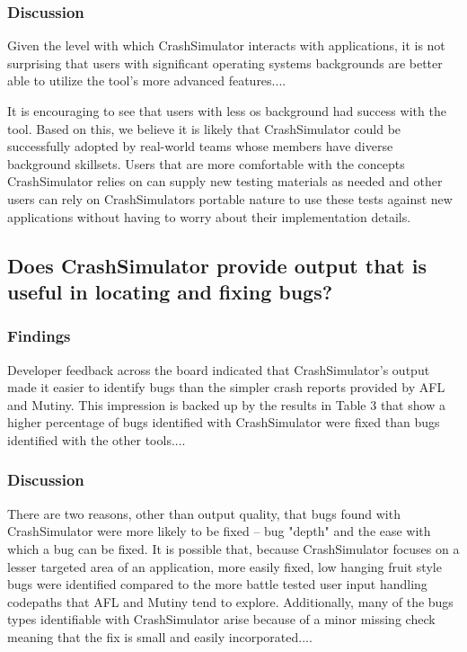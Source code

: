 \subsubsection{Discussion}

Given the level with which CrashSimulator interacts with applications, it
is not surprising that users with significant operating systems backgrounds
are better able to utilize the tool's more advanced features....

It is encouraging to see that users with less os background had success
with the tool.  Based on this, we believe it is likely that CrashSimulator
could be successfully adopted by real-world teams whose members have
diverse background skillsets.  Users that are more comfortable with the
concepts CrashSimulator relies on can supply new testing materials as
needed and other users can rely on CrashSimulators portable nature to use
these tests against new applications without having to worry about their
implementation details.


\subsection{Does CrashSimulator provide output that is useful in locating
and fixing bugs?}


\subsubsection{Findings}

Developer feedback across the board indicated that CrashSimulator's output
made it easier to identify bugs than the simpler crash reports provided by
AFL and Mutiny.  This impression is backed up by the results in Table 3
that show a higher percentage of bugs identified with CrashSimulator were
fixed than bugs identified with the other tools....


\subsubsection{Discussion}

There are two reasons, other than output quality, that bugs found with
CrashSimulator were more likely to be fixed -- bug "depth" and the ease
with which a bug can be fixed.  It is possible that, because CrashSimulator
focuses on a lesser targeted area of an application, more easily fixed, low
hanging fruit style bugs were identified compared to the more battle tested
user input handling codepaths that AFL and Mutiny tend to explore.
Additionally, many of the bugs types identifiable with CrashSimulator arise
because of a minor missing check meaning that the fix is small and easily
incorporated....
